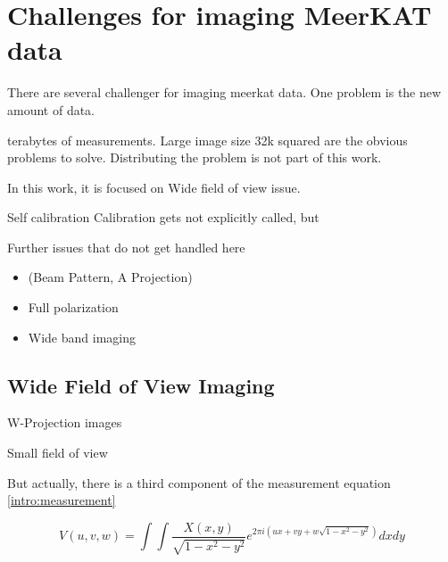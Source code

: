 \section{Challenges for imaging MeerKAT data} \label{meerkat}

There are several challenger for imaging meerkat data. One problem is the new amount of data.

terabytes of measurements. Large image size 32k squared are the obvious problems to solve. Distributing the problem is not part of this work.

 In this work, it is focused on Wide field of view issue. 


Self calibration Calibration gets not explicitly called, but 

Further issues that do not get handled here
\begin{itemize}
	\item (Beam Pattern, A Projection)
	\item Full polarization
	\item Wide band imaging
\end{itemize}



\subsection{Wide Field of View Imaging} \label{wof}
W-Projection images 

Small field of view


But actually, there is a third component of the measurement equation \eqref{intro:measurement}

\begin{equation}\label{meerkat:ftsphere}
V(u, v, w) = \int\int \frac{X(x, y)}{\sqrt{1 - x^2 - y ^2}} e^{2 \pi i (ux+vy+ w\sqrt{1 - x^2 - y ^2})}dx dy
\end{equation}


